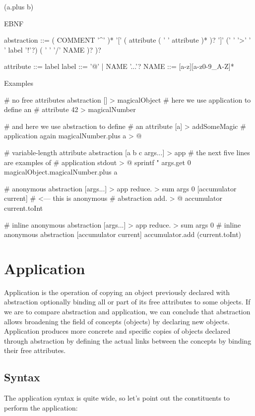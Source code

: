 \documentclass[12pt]{book}
\begin{document}
\begin{ffcode}
[a b] (a.plus b)
\end{ffcode}

EBNF

\begin{ffcode}
abstraction ::= ( COMMENT '^' )*
            '[' ( attribute ( ' ' attribute )* )? ']'
            (' ' '>' ' ' label '!'?) ( ' ' '/' NAME )? )?
            
attribute ::= label
label ::= '@' | NAME '...'?
NAME ::= [a-z][a-z0-9_A-Z]*
\end{ffcode}

Examples
\begin{ffcode}
# no free attributes abstraction
[] > magicalObject
  # here we use application to define an 
  # attribute
  42 > magicalNumber

  # and here we use abstraction to define 
  # an attribute
  [a] > addSomeMagic
    # application again
    magicalNumber.plus a > @

# variable-length attribute abstraction
[a b c args...] > app
  # the next five lines are examples of 
  # application
  stdout > @
    sprintf
      "\n%
      args.get 0
      magicalObject.magicalNumber.plus a

# anonymous abstraction
[args...] > app
  reduce. > sum
    args
    0
    [accumulator current] # <--- this is anonymous
    # abstraction
      add. > @
        accumulator
        current.toInt

# inline anonymous abstraction
[args...] > app
  reduce. > sum
    args
    0
    # inline anonymous abstraction
    [accumulator current] accumulator.add (current.toInt)
\end{ffcode}

\section{Application}
Application is the operation of copying an object previously declared with abstraction optionally binding all or part of its free attributes to some objects.
If we are to compare abstraction and application, we can conclude that abstraction allows broadening the field of concepts (objects) by declaring new objects. Application produces more concrete and specific copies of objects declared through abstraction by defining the actual links between the concepts by binding their free attributes.

\subsection{Syntax}
The application syntax is quite wide, so let's point out the constituents to perform the application:
\end{document}
